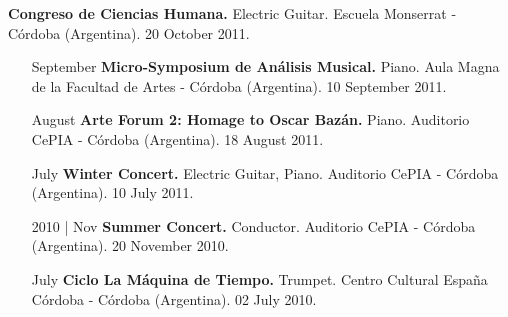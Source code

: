 \documentclass[12pt,overlapped]{res}%
\begin{document}
\begin{resume}
\begin{itemize}[align=parleft,leftmargin=2.25cm,labelwidth=2cm]
\textbf{Congreso de Ciencias Humana.}
Electric Guitar. 
Escuela Monserrat {-} Córdoba (Argentina). 
20 October 2011.
\end{itemize}%
\begin{itemize}[align=parleft,leftmargin=2.25cm,labelwidth=2cm]
\item[September]
\textbf{Micro{-}Symposium de Análisis Musical.}
Piano. 
Aula Magna de la Facultad de Artes {-} Córdoba (Argentina). 
10 September 2011.
\end{itemize}%
\begin{itemize}[align=parleft,leftmargin=2.25cm,labelwidth=2cm]
\item[August]
\textbf{Arte Forum 2: Homage to Oscar Bazán.}
Piano. 
Auditorio CePIA {-} Córdoba (Argentina). 
18 August 2011.
\end{itemize}%
\begin{itemize}[align=parleft,leftmargin=2.25cm,labelwidth=2cm]
\item[July]
\textbf{Winter Concert.}
Electric Guitar, Piano. 
Auditorio CePIA {-} Córdoba (Argentina). 
10 July 2011.
\end{itemize}%
\begin{itemize}[align=parleft,leftmargin=2.25cm,labelwidth=2cm]
\item[2010 | Nov]
\textbf{Summer Concert.}
Conductor. 
Auditorio CePIA {-} Córdoba (Argentina). 
20 November 2010.
\end{itemize}%
\begin{itemize}[align=parleft,leftmargin=2.25cm,labelwidth=2cm]
\item[July]
\textbf{Ciclo La Máquina de Tiempo.}
Trumpet. 
Centro Cultural España Córdoba {-} Córdoba (Argentina). 
02 July 2010.
\end{itemize}%

\end{resume}
\end{document}
